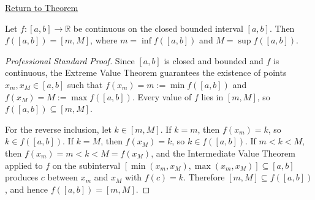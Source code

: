 \newpage
{}
\label{prf:image-of-closed-bounded-interval}

\begin{remark*}[Return]
\hyperref[thm:image-of-closed-bounded-interval]{Return to Theorem}
\end{remark*}

\begin{theorem*}
Let $f : [a,b] \to \mathbb{R}$ be continuous on the closed bounded interval $[a,b]$. Then $f([a,b]) = [m, M]$, where $m = \inf f([a,b])$ and $M = \sup f([a,b])$.
\end{theorem*}

\begin{proof}[Professional Standard Proof]
\LRAProofBodyStart
Since $[a,b]$ is closed and bounded and $f$ is continuous, the Extreme Value Theorem guarantees the existence of points $x_m, x_M \in [a,b]$ such that $f(x_m) = m := \min f([a,b])$ and $f(x_M) = M := \max f([a,b])$. Every value of $f$ lies in $[m, M]$, so $f([a,b]) \subseteq [m, M]$.

For the reverse inclusion, let $k \in [m,M]$. If $k = m$, then $f(x_m) = k$, so $k \in f([a,b])$. If $k = M$, then $f(x_M) = k$, so $k \in f([a,b])$. If $m < k < M$, then $f(x_m) = m < k < M = f(x_M)$, and the Intermediate Value Theorem applied to $f$ on the subinterval $[\min(x_m, x_M), \max(x_m, x_M)] \subseteq [a,b]$ produces $c$ between $x_m$ and $x_M$ with $f(c) = k$. Therefore $[m,M] \subseteq f([a,b])$, and hence $f([a,b]) = [m, M]$.
\end{proof}

